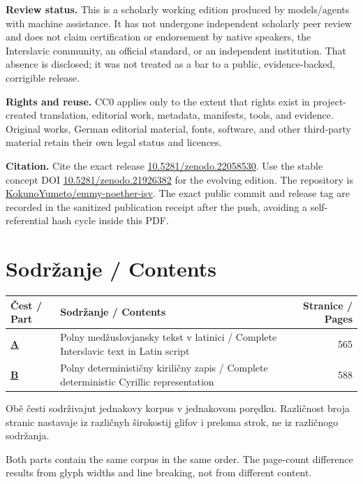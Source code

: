 \documentclass[11pt]{article}
\newcommand{\doiurl}[1]{\href{https://doi.org/#1}{#1}}
\newcommand{\repo}{\href{https://github.com/KokunoYumeto/emmy-noether-isv}{KokunoYumeto/emmy-noether-isv}}
\begin{document}
\textbf{Review status.} This is a scholarly working edition produced by models/agents with machine assistance. It has not undergone independent scholarly peer review and does not claim certification or endorsement by native speakers, the Interslavic community, an official standard, or an independent institution. That absence is disclosed; it was not treated as a bar to a public, evidence-backed, corrigible release.

\textbf{Rights and reuse.} CC0 applies only to the extent that rights exist in project-created translation, editorial work, metadata, manifests, tools, and evidence. Original works, German editorial material, fonts, software, and other third-party material retain their own legal status and licences.

\textbf{Citation.} Cite the exact release \doiurl{10.5281/zenodo.22058530}. Use the stable concept DOI \doiurl{10.5281/zenodo.21926382} for the evolving edition. The repository is \repo. The exact public commit and release tag are recorded in the sanitized publication receipt after the push, avoiding a self-referential hash cycle inside this PDF.
\clearpage

\section*{Sodržanje / Contents}
\begin{tabularx}{\textwidth}{@{}>{\bfseries}l X r@{}}
\toprule
Čest / Part & Sodržanje / Contents & Stranice / Pages\\
\midrule
\hyperref[part:latn]{A} & Polny medžuslovjansky tekst v latinici / Complete Interslavic text in Latin script & 565\\
\hyperref[part:cyrl]{B} & Polny determinističny kiriličny zapis / Complete deterministic Cyrillic representation & 588\\
\bottomrule
\end{tabularx}

\vspace{1.5em}
Obě česti sodrživajut jednakovy korpus v jednakovom porędku. Različnost broja stranic nastavaje iz različnyh širokostij glifov i preloma strok, ne iz različnogo sodržanja.

Both parts contain the same corpus in the same order. The page-count difference results from glyph widths and line breaking, not from different content.
\clearpage
\end{document}
